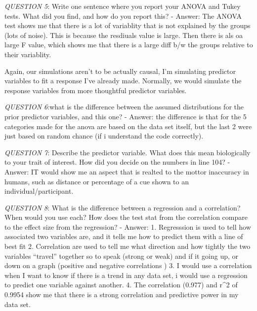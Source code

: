 \documentclass[
]{article}
\begin{document}
\emph{QUESTION 5}: Write one sentence where you report your ANOVA and
Tukey tests. What did you find, and how do you report this? - Answer:
The ANOVA test shows me that there is a lot of variablity that is not
explained by the groups (lots of noise). This is because the resdiuals
value is large. Then there is als oa large F value, which shows me that
there is a large diff b/w the groups relative to their variablity.

Again, our simulations aren't to be actually causal, I'm simulating
predictor variables to fit a response I've already made. Normally, we
would simulate the response variables from more thoughtful predictor
variables.

\emph{QUESTION 6}:what is the difference between the assumed
distributions for the prior predictor variables, and this one? - Answer:
the difference is that for the 5 categories made for the anova are based
on the data set itself, but the last 2 were just based on random chance
(if i understand the code correctly).

\emph{QUESTION 7}: Describe the predictor variable. What does this mean
biologically to your trait of interest. How did you decide on the
numbers in line 104? - Answer: IT would show me an aspect that is
realted to the mottor inaccuracy in humans, such as distance or
percentage of a cue shown to an individual/participant.

\emph{QUESTION 8}: What is the difference between a regression and a
correlation? When would you use each? How does the test stat from the
correlation compare to the effect size from the regression? - Answer: 1.
Regresssion is used to tell how associated two variables are, and it
tells me how to predict them with a line of best fit 2. Correlation are
used to tell me what direction and how tightly the two variables
``travel'' together so to speak (strong or weak) and if it going up, or
down on a graph (positive and negative correlations ) 3. I would use a
correlation when I want to know if there is a trend in any data set, i
would use a regression to predict one variable against another. 4. The
correlation (0.977) and r\^{}2 of 0.9954 show me that there is a strong
correlation and predictive power in my data set.
\end{document}
